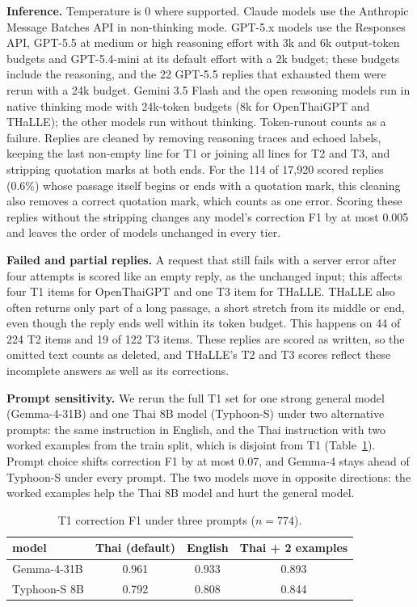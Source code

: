 \documentclass[11pt]{article}
\begin{document}
\textbf{Inference.} Temperature is 0 where supported. Claude
models use the Anthropic Message Batches API in non-thinking mode. GPT-5.x models use the
Responses API, GPT-5.5 at medium or high reasoning effort with 3k and 6k output-token budgets and
GPT-5.4-mini at its default effort with a 2k budget; these budgets include the reasoning, and the 22 GPT-5.5 replies that exhausted them were rerun
with a 24k budget. Gemini
3.5 Flash and the open reasoning models run in native thinking mode with 24k-token budgets (8k
for OpenThaiGPT and THaLLE); the other models run without thinking. Token-runout counts as a
failure. Replies
are cleaned by removing reasoning traces and echoed labels, keeping the last non-empty line for T1
or joining all lines for T2 and T3, and stripping quotation marks at both ends. For the 114 of
17{,}920 scored replies (0.6\%) whose passage itself begins or ends with a quotation mark, this
cleaning also removes a correct quotation mark, which counts as one error. Scoring these replies
without the stripping changes any model's correction F1 by at most 0.005 and leaves the order of
models unchanged in every tier.

\textbf{Failed and partial replies.} A request that still fails with a server error after four
attempts is scored like an empty reply, as the unchanged input; this affects four T1 items for
OpenThaiGPT and one T3 item for THaLLE. THaLLE also often returns only part of a long passage,
a short stretch from its middle or end, even though the reply ends well within its token budget.
This happens on 44 of 224 T2 items and 19 of 122 T3 items. These replies are scored as written,
so the omitted text counts as deleted, and THaLLE's T2 and T3 scores reflect these incomplete
answers as well as its corrections.

\textbf{Prompt sensitivity.} We rerun the full T1 set for one strong general model (Gemma-4-31B)
and one Thai 8B model (Typhoon-S) under two alternative prompts: the same instruction in English,
and the Thai instruction with two worked examples from the train split, which is disjoint from T1 (Table~\ref{tab:prompt}).
Prompt choice shifts correction F1 by at most 0.07, and Gemma-4 stays ahead of Typhoon-S under
every prompt. The two models move in opposite directions: the worked examples help the Thai 8B
model and hurt the general model.

\begin{table}[t]
\centering\small\setlength{\tabcolsep}{3pt}
\begin{tabular}{@{}lccc@{}}
\toprule
model & Thai (default) & English & Thai + 2 examples \\
\midrule
Gemma-4-31B & 0.961 & 0.933 & 0.893 \\
Typhoon-S 8B & 0.792 & 0.808 & 0.844 \\
\bottomrule
\end{tabular}
\caption{T1 correction F1 under three prompts ($n = 774$).}
\label{tab:prompt}
\end{table}
\end{document}
